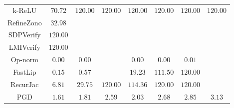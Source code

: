 \begin{table}
{\begin{tabular}{c|c|c|c|c|c|c|c}
       k-ReLU &       $70.72$ &      $120.00$ &      $120.00$ &      $120.00$ &      $120.00$ &      $120.00$ &      $120.00$ \\
   RefineZono &       $32.98$ &               &               &               &               &               &               \\
    SDPVerify &      $120.00$ &               &               &               &               &               &               \\
    LMIVerify &      $120.00$ &               &               &               &               &               &               \\
      Op-norm &        $0.00$ &        $0.00$ &               &        $0.00$ &        $0.00$ &        $0.01$ &               \\
      FastLip &        $0.15$ &        $0.57$ &               &       $19.23$ &      $111.50$ &      $120.00$ &               \\
     RecurJac &        $6.81$ &       $29.75$ &      $120.00$ &      $114.36$ &      $120.00$ &      $120.00$ &               \\
\hline
          PGD &        $1.61$ &        $1.81$ &        $2.59$ &        $2.03$ &        $2.68$ &        $2.85$ &        $3.13$ \\

    \bottomrule
    \end{tabular}
    \label{table:exp-A-average-radius-time-mnist-0}
    }
\end{table}
        

